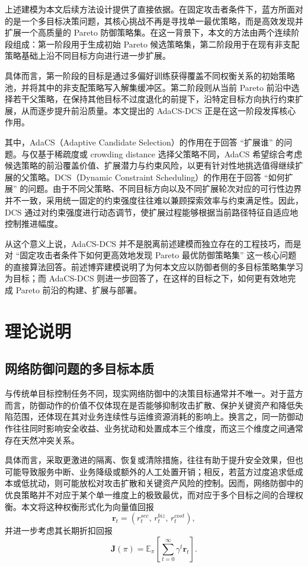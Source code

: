 \documentclass[12pt,a4paper]{article}
\begin{document}
上述建模为本文后续方法设计提供了直接依据。在固定攻击者条件下，蓝方所面对的是一个多目标决策问题，其核心挑战不再是寻找单一最优策略，而是高效发现并扩展一个高质量的 Pareto 防御策略集。在这一背景下，本文的方法由两个连续阶段组成：第一阶段用于生成初始 Pareto 候选策略集，第二阶段用于在现有非支配策略基础上沿不同目标方向进行进一步扩展。

具体而言，第一阶段的目标是通过多偏好训练获得覆盖不同权衡关系的初始策略池，并将其中的非支配策略写入解集缓冲区。第二阶段则从当前 Pareto 前沿中选择若干父策略，在保持其他目标不过度退化的前提下，沿特定目标方向执行约束扩展，从而逐步提升前沿质量。本文提出的 AdaCS-DCS 正是在这一阶段发挥核心作用。

其中，AdaCS（Adaptive Candidate Selection）的作用在于回答 ``扩展谁'' 的问题。与仅基于稀疏度或 crowding distance 选择父策略不同，AdaCS 希望综合考虑候选策略的前沿覆盖价值、扩展潜力与约束风险，以更有针对性地挑选值得继续扩展的父策略。DCS（Dynamic Constraint Scheduling）的作用在于回答 ``如何扩展'' 的问题。由于不同父策略、不同目标方向以及不同扩展轮次对应的可行性边界并不一致，采用统一固定的约束强度往往难以兼顾探索效率与约束满足性。因此，DCS 通过对约束强度进行动态调节，使扩展过程能够根据当前路径特征自适应地控制推进幅度。

从这个意义上说，AdaCS-DCS 并不是脱离前述建模而独立存在的工程技巧，而是对 ``固定攻击者条件下如何更高效地发现 Pareto 最优防御策略集'' 这一核心问题的直接算法回答。前述博弈建模说明了为何本文应以防御者侧的多目标策略集学习为目标；而 AdaCS-DCS 则进一步回答了，在这样的目标之下，如何更有效地完成 Pareto 前沿的构建、扩展与部署。


\section{理论说明}
\subsection{网络防御问题的多目标本质}

与传统单目标控制任务不同，现实网络防御中的决策目标通常并不唯一。对于蓝方而言，防御动作的价值不仅体现在是否能够抑制攻击扩散、保护关键资产和降低失陷范围，还体现在其对业务连续性与运维资源消耗的影响上。换言之，同一防御动作往往同时影响安全收益、业务扰动和处置成本三个维度，而这三个维度之间通常存在天然冲突关系。

具体而言，采取更激进的隔离、恢复或清除措施，往往有助于提升安全效果，但也可能导致服务中断、业务降级或额外的人工处置开销；相反，若蓝方过度追求低成本或低扰动，则可能放松对攻击扩散和关键资产风险的控制。因而，网络防御中的优良策略并不对应于某个单一维度上的极致最优，而对应于多个目标之间的合理权衡。本文将这种权衡形式化为向量值回报
\begin{equation}
\mathbf{r}_t = \left(r_t^{sec},\, r_t^{biz},\, r_t^{cost}\right),
\end{equation}
并进一步考虑其长期折扣回报
\begin{equation}
\mathbf{J}(\pi)
=
\mathbb{E}_{\pi}
\left[
\sum_{t=0}^{\infty} \gamma^t \mathbf{r}_t
\right].
\end{equation}
\end{document}
